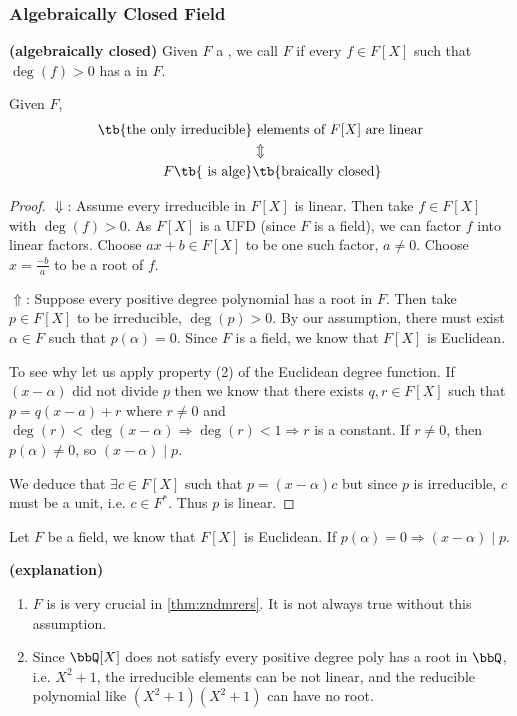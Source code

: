 \documentclass{article}
\newcommand{\bfs}[1]{\textbf{({#1}) }}
\begin{document}
\subsubsection{Algebraically Closed Field}\label{sec:dgafac}
\begin{defa}\bfs{algebraically closed}\label{def:danc}
Given $F$ a , we call $F$  if every $f \in F[X]$ such that $\deg(f)>0$ has a  in $F$.
\end{defa}
\begin{thma}\label{thm:zndmrers}
Given   $F$,  
\begin{align*}
    \text{\tb{the only irreducible}} &\text{ elements of $F[X]$ are linear} \\
    &\Updownarrow\\
    F \text{\tb{ is alge}} &\text{\tb{braically closed} }\\
\end{align*}
\end{thma}
\begin{proof}
 $\Downarrow$:
Assume every irreducible in $F[X]$ is linear. Then take $f \in F[X]$ with $\deg(f)>0$. As $F[X]$ is a UFD (since $F$ is a field), we can factor $f$ into linear factors. Choose $a x+b \in F[X]$ to be one such factor, $a \neq 0$. Choose $x=\frac{-b}{a}$ to be a root of $f$.

$\Uparrow$:
Suppose every positive degree polynomial has a root in $F$. Then take $p \in F[X]$ to be irreducible, $\deg(p)>0$. By our assumption, there must exist $\alpha \in F$ such that $p(\alpha)=0$. Since $F$ is a field, we know that $F[X]$ is Euclidean.


To see why let us apply property (2) of the Euclidean degree function. If $(x-\alpha)$ did not divide $p$ then we know that there exists $q, r \in F[X]$ such that $p=q(x-a)+r$ where $r \neq 0$ and $\deg(r)<\deg(x-\alpha) \Rightarrow \deg(r)<1 \Rightarrow r$ is a constant. If $r \neq 0$, then $p(\alpha) \neq 0$, so $(x-\alpha) \mid p$. 

We deduce that $\exists c \in F[X]$ such that $p=(x-\alpha) c$ but since $p$ is irreducible, $c$ must be a unit, i.e. $c \in F^{*}$. Thus $p$ is linear.
\end{proof} 
\begin{cora}\label{cor:ienada}
Let $F$ be a field, we know that $F[X]$ is Euclidean.  If $p(\alpha)=0 \Rightarrow (x-\alpha) \mid p$.
\end{cora}
\begin{rema}\bfs{explanation}
\begin{enumerate}
    \item  $F$ is  is very crucial in \cref{thm:zndmrers}. It is not always true without this assumption.
    \item Since $\bbQ[X]$ does not satisfy every positive degree poly has a root in $\bbQ$, i.e. $X^{2}+1$, the irreducible elements can be not linear, and the reducible polynomial like $(X^{2}+1)(X^{2}+1)$ can have no root.
\end{enumerate}
\end{rema}
\end{document}
